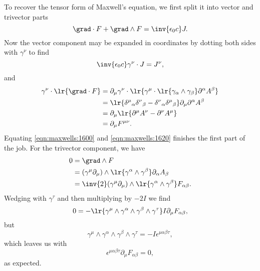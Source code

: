 {To recover the tensor form of Maxwell's equation, we first split it into vector and trivector parts
\begin{equation}\label{eqn:maxwells:1580}
\grad \cdot F + \grad \wedge F = \inv{\epsilon_0 c} J.
\end{equation}
Now the vector component may be expanded in coordinates by dotting both sides with \( \gamma^\nu \) to find
\begin{equation}\label{eqn:maxwells:1600}
\inv{\epsilon_0 c} \gamma^\nu \cdot J = J^\nu,
\end{equation}
and
\begin{equation}\label{eqn:maxwells:1620}
\begin{aligned}
\gamma^\nu \cdot
\lr{ \grad \cdot F }
&=
\partial_\mu \gamma^\nu \cdot \lr{ \gamma^\mu \cdot \lr{ \gamma_\alpha \wedge \gamma_\beta } \partial^\alpha A^\beta } \\
&=
\lr{
   {\delta^\mu}_\alpha
   {\delta^\nu}_\beta
   -
   {\delta^\nu}_\alpha
   {\delta^\mu}_\beta
}
\partial_\mu
\partial^\alpha A^\beta \\
&=
\partial_\mu
\lr{
   \partial^\mu A^\nu
   -
   \partial^\nu A^\mu
} \\
&=
\partial_\mu F^{\mu\nu}.
\end{aligned}
\end{equation}
Equating \cref{eqn:maxwells:1600} and \cref{eqn:maxwells:1620} finishes the first part of the job.  For the trivector component, we have
\begin{equation}\label{eqn:maxwells:1640}
\begin{aligned}
0
&= \grad \wedge F \\
&= (\gamma^\mu \partial_\mu) \wedge \lr{ \gamma^\alpha \wedge \gamma^\beta } \partial_\alpha A_\beta \\
&= \inv{2} (\gamma^\mu \partial_\mu) \wedge \lr{ \gamma^\alpha \wedge \gamma^\beta } F_{\alpha \beta}.
\end{aligned}
\end{equation}
Wedging with \( \gamma^\tau \) and then multiplying by \( -2 I \) we find
\begin{equation}\label{eqn:maxwells:1660}
0 = - \lr{ \gamma^\mu \wedge \gamma^\alpha \wedge \gamma^\beta \wedge \gamma^\tau } I \partial_\mu F_{\alpha \beta},
\end{equation}
but
\begin{equation}\label{eqn:maxwells:1680}
\gamma^\mu \wedge \gamma^\alpha \wedge \gamma^\beta \wedge \gamma^\tau = -I \epsilon^{\mu \alpha \beta \tau},
\end{equation}
which leaves us with
\begin{equation}\label{eqn:maxwells:1700}
\epsilon^{\mu \alpha \beta \tau}  \partial_\mu F_{\alpha \beta} = 0,
\end{equation}
as expected.
} %
